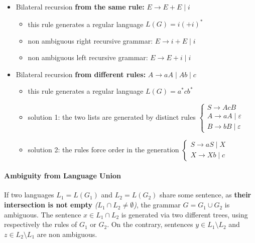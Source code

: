 \documentclass[english]{article}
\begin{document}
\begin{itemize}
  \item Bilateral recursion \textbf{from the same rule:} \(E \rightarrow E + E \mid i\)
        \begin{itemize}
          \item this rule generates a regular language \(L(G) = i (+i)^\ast\)
          \item non ambiguous right recursive grammar: \(E \rightarrow i + E \mid i\)
          \item non ambiguous left recursive grammar: \(E \rightarrow E + i \mid i\)
        \end{itemize}
  \item Bilateral recursion \textbf{from different rules:} \(A \rightarrow aA \mid Ab \mid c\)
        \begin{itemize}
          \item this rule generates a regular language \(L(G) = a^\ast c b^\ast\)
          \item solution 1: the two lists are generated by distinct rules
                \(\begin{cases}
                  S  \rightarrow AcB                 \\
                  A  \rightarrow aA \mid \varepsilon \\
                  B  \rightarrow bB \mid \varepsilon
                \end{cases}\)
          \item solution 2: the rules force order in the generation
                \(\begin{cases}
                  S \rightarrow aS \mid X \\
                  X \rightarrow Xb \mid c
                \end{cases}\)
        \end{itemize}
\end{itemize}

\paragraph{Ambiguity from Language Union}

If two languages \(L_1 = L(G_1)\) and \(L_2 = L(G_2)\) share some sentence, as \textbf{their intersection is not empty} \textit{(\(L_1 \cap L_2 \neq \emptyset\))}, the grammar \(G = G_1 \cup G_2\) is ambiguous.
The sentence \(x \in L_1 \cap L_2\) is generated via two different trees, using respectively the rules of \(G_1\) or \(G_2\).
On the contrary, sentences \(y \in L_1 \setminus L_2\) and \(z \in L_2 \setminus L_1\) are non ambiguous.
\end{document}

